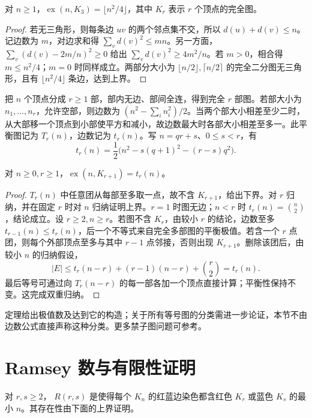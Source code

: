 \documentclass[UTF8,12pt,a4paper,fontset=fandol]{ctexbook}
\begin{document}
\begin{theorem}[Mantel 定理]
对 $n\ge1$，$\operatorname{ex}(n,K_3)=\lfloor n^2/4\rfloor$，其中 $K_r$ 表示 $r$ 个顶点的完全图。
\end{theorem}
\begin{proof}
若无三角形，则每条边 $uv$ 的两个邻点集不交，所以 $d(u)+d(v)\le n$。记边数为 $m$，对边求和得 $\sum_vd(v)^2\le mn$。另一方面，$\sum_v(d(v)-2m/n)^2\ge0$ 给出 $\sum_vd(v)^2\ge4m^2/n$。若 $m>0$，相合得 $m\le n^2/4$；$m=0$ 时同样成立。两部分大小为 $\lfloor n/2\rfloor,\lceil n/2\rceil$ 的完全二分图无三角形，且有 $\lfloor n^2/4\rfloor$ 条边，达到上界。
\end{proof}

把 $n$ 个顶点分成 $r\ge1$ 部，部内无边、部间全连，得到完全 $r$ 部图。若部大小为 $n_1,\ldots,n_r$，允许空部，则边数为 $(n^2-\sum_i n_i^2)/2$。当两个部大小相差至少二时，从大部移一个顶点到小部使平方和减小，故边数最大时各部大小相差至多一。此平衡图记为 $T_r(n)$，边数记为 $t_r(n)$。写 $n=qr+s$、$0\le s<r$，有
\[
 t_r(n)=\frac12\bigl(n^2-s(q+1)^2-(r-s)q^2\bigr).
\]

\begin{theorem}[Tur\'an 定理]
对 $n\ge0,r\ge1$，$\operatorname{ex}(n,K_{r+1})=t_r(n)$。
\end{theorem}
\begin{proof}
$T_r(n)$ 中任意团从每部至多取一点，故不含 $K_{r+1}$，给出下界。对 $r$ 归纳，并在固定 $r$ 时对 $n$ 归纳证明上界。$r=1$ 时图无边；$n<r$ 时 $t_r(n)=\binom n2$，结论成立。设 $r\ge2,n\ge r$。若图不含 $K_r$，由较小 $r$ 的结论，边数至多 $t_{r-1}(n)\le t_r(n)$，后一个不等式来自完全多部图的平衡极值。若含一个 $r$ 点团，则每个外部顶点至多与其中 $r-1$ 点邻接，否则出现 $K_{r+1}$。删除该团后，由较小 $n$ 的归纳假设，
\[
 |E|\le t_r(n-r)+(r-1)(n-r)+\binom r2=t_r(n).
\]
最后等号可通过向 $T_r(n-r)$ 的每一部各加一个顶点直接计算；平衡性保持不变。这完成双重归纳。
\end{proof}

定理给出极值数及达到它的构造；关于所有等号图的分类需进一步论证，本节不由边数公式直接声称这种分类。更多禁子图问题可参考\cite{zhao-graph-notes}。

\section{Ramsey 数与有限性证明}

\begin{definition}
对 $r,s\ge2$， $R(r,s)$ 是使得每个 $K_n$ 的红蓝边染色都含红色 $K_r$ 或蓝色 $K_s$ 的最小 $n$。其存在性由下面的上界证明。
\end{definition}
\end{document}
